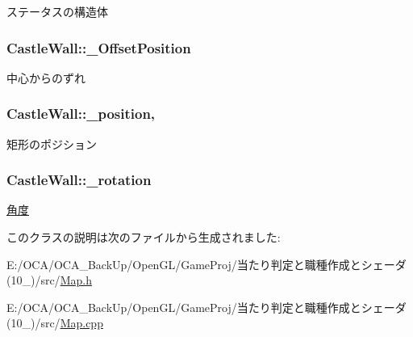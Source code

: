 ステータスの構造体 

\hypertarget{class_castle_wall_a2f7b20a81e21b11edf72a8b1994779fa}{
\subsubsection[{\-\_\-\-Offset\-Position}]{ Castle\-Wall\-::\-\_\-\-Offset\-Position\hspace{0.3cm}{\ttfamily [protected]}}}\label{class_castle_wall_a2f7b20a81e21b11edf72a8b1994779fa}


中心からのずれ 

\hypertarget{class_castle_wall_a86ce1f0330306ec483b89966637b4bb7}{
\subsubsection[{\-\_\-position}]{ Castle\-Wall\-::\-\_\-position\hspace{0.3cm}{\ttfamily [static]}, {\ttfamily [protected]}}}\label{class_castle_wall_a86ce1f0330306ec483b89966637b4bb7}


矩形のポジション 

\hypertarget{class_castle_wall_a4c821b732dd44bd8378f6f4b54187b81}{
\subsubsection[{\-\_\-rotation}]{ Castle\-Wall\-::\-\_\-rotation\hspace{0.3cm}{\ttfamily [protected]}}}\label{class_castle_wall_a4c821b732dd44bd8378f6f4b54187b81}


\hyperlink{class_xE8_xA7_x92_xE5_xBA_xA6}{角度} 



このクラスの説明は次のファイルから生成されました\-:\begin{DoxyCompactItemize}
\item 
E\-:/\-O\-C\-A/\-O\-C\-A\-\_\-\-Back\-Up/\-Open\-G\-L/\-Game\-Proj/当たり判定と職種作成とシェーダ(10\-\_)/src/\hyperlink{_map_8h}{Map.\-h}\item 
E\-:/\-O\-C\-A/\-O\-C\-A\-\_\-\-Back\-Up/\-Open\-G\-L/\-Game\-Proj/当たり判定と職種作成とシェーダ(10\-\_)/src/\hyperlink{_map_8cpp}{Map.\-cpp}\end{DoxyCompactItemize}
